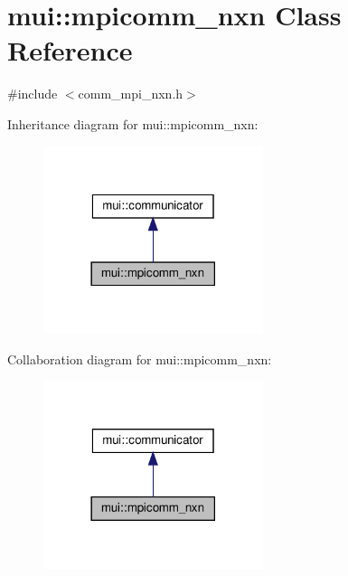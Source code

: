 \hypertarget{classmui_1_1mpicomm__nxn}{}\section{mui\+:\+:mpicomm\+\_\+nxn Class Reference}
\label{classmui_1_1mpicomm__nxn}


{\ttfamily \#include $<$comm\+\_\+mpi\+\_\+nxn.\+h$>$}



Inheritance diagram for mui\+:\+:mpicomm\+\_\+nxn\+:
\nopagebreak
\begin{figure}[H]
\begin{center}
\leavevmode
\includegraphics[width=182pt]{classmui_1_1mpicomm__nxn__inherit__graph}
\end{center}
\end{figure}


Collaboration diagram for mui\+:\+:mpicomm\+\_\+nxn\+:
\nopagebreak
\begin{figure}[H]
\begin{center}
\leavevmode
\includegraphics[width=182pt]{classmui_1_1mpicomm__nxn__coll__graph}
\end{center}
\end{figure}
